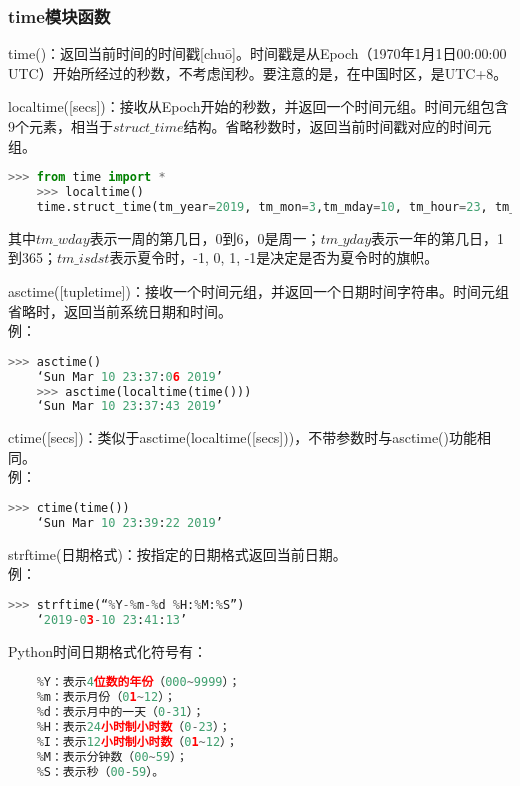\documentclass[11pt,a4paper]{article}
\begin{document}
\subsubsection{time模块函数}

time()：返回当前时间的时间戳[chuō]。时间戳是从Epoch（1970年1月1日00:00:00 UTC）开始所经过的秒数，不考虑闰秒。要注意的是，在中国时区，是UTC+8。

localtime([secs])：接收从Epoch开始的秒数，并返回一个时间元组。时间元组包含9个元素，相当于$struct \_ time$结构。省略秒数时，返回当前时间戳对应的时间元组。

\begin{lstlisting}[language={Python}]
    >>> from time import *
    >>> localtime()
    time.struct_time(tm_year=2019, tm_mon=3,tm_mday=10, tm_hour=23, tm_min=33, tm_sec=43,tm_wday=6, tm_yday=69, tm_isdst=0)
\end{lstlisting}

其中$tm \_ wday$表示一周的第几日，0到6，0是周一；$tm \_ yday$表示一年的第几日，1到365；$tm \_ isdst$表示夏令时，-1, 0, 1, -1是决定是否为夏令时的旗帜。

asctime([tupletime])：接收一个时间元组，并返回一个日期时间字符串。时间元组省略时，返回当前系统日期和时间。\\
例：
\begin{lstlisting}[language={Python}]
    >>> asctime()
    ‘Sun Mar 10 23:37:06 2019’
    >>> asctime(localtime(time()))
    ‘Sun Mar 10 23:37:43 2019’
\end{lstlisting}

ctime([secs])：类似于asctime(localtime([secs]))，不带参数时与asctime()功能相同。\\
例：
\begin{lstlisting}[language={Python}]
    >>> ctime(time())
    ‘Sun Mar 10 23:39:22 2019’
\end{lstlisting}

strftime(日期格式)：按指定的日期格式返回当前日期。\\
例：
\begin{lstlisting}[language={Python}]
    >>> strftime(“%Y-%m-%d %H:%M:%S”)
    ‘2019-03-10 23:41:13’
\end{lstlisting}

Python时间日期格式化符号有：
\begin{lstlisting}[language={Python}]
    %y：表示两位数的年份（00~99）；
    %Y：表示4位数的年份（000~9999）；
    %m：表示月份（01~12）；
    %d：表示月中的一天（0-31）；
    %H：表示24小时制小时数（0-23）；
    %I：表示12小时制小时数（01~12）；
    %M：表示分钟数（00~59）；
    %S：表示秒（00-59）。
\end{lstlisting}
\end{document}
